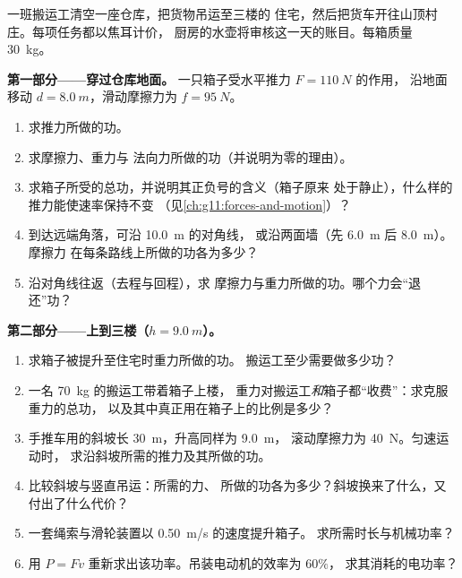 \begin{problem}
\label{pb:g11:work-of-force:1}
一班搬运工清空一座仓库，把货物吊运至三楼的
住宅，然后把货车开往山顶村庄。每项任务都以焦耳计价，
厨房的水壶将审核这一天的账目。每箱质量 \qty{30}{kg}。

\medskip
\noindent\textbf{第一部分——穿过仓库地面。}
一只箱子受水平推力 $F = \qty{110}{N}$ 的作用，
沿地面移动 $d = \qty{8.0}{m}$，滑动摩擦力为 $f = \qty{95}{N}$。
\begin{enumerate}
  \item 求推力所做的功。
  \item 求摩擦力、重力与
        法向力所做的功（并说明为零的理由）。
  \item 求箱子所受的总功，并说明其正负号的含义（箱子原来
        处于静止），什么样的推力能使速率保持不变
        （见\cref{ch:g11:forces-and-motion}）？
  \item 到达远端角落，可沿 \qty{10.0}{m} 的对角线，
        或沿两面墙（先 \qty{6.0}{m} 后 \qty{8.0}{m}）。摩擦力
        在每条路线上所做的功各为多少？
  \item 沿对角线往返（去程与回程），求
        摩擦力与重力所做的功。哪个力会“退还”功？
\end{enumerate}

\medskip
\noindent\textbf{第二部分——上到三楼（$h = \qty{9.0}{m}$）。}
\begin{enumerate}[resume]
  \item 求箱子被提升至住宅时重力所做的功。
        搬运工至少需要做多少功？
  \item 一名 \qty{70}{kg} 的搬运工带着箱子上楼，
        重力对搬运工\emph{和}箱子都“收费”：求克服重力的总功，
        以及其中真正用在箱子上的比例是多少？
  \item 手推车用的斜坡长 \qty{30}{m}，升高同样为 \qty{9.0}{m}，
        滚动摩擦力为 \qty{40}{N}。匀速运动时，
        求沿斜坡所需的推力及其所做的功。
  \item 比较斜坡与竖直吊运：所需的力、
        所做的功各为多少？斜坡换来了什么，又付出了什么代价？
  \item 一套绳索与滑轮装置以 \qty{0.50}{m/s} 的速度提升箱子。
        求所需时长与机械功率？
  \item 用 $P = Fv$ 重新求出该功率。吊装电动机的效率为 $60\%$，
        求其消耗的电功率？
\end{enumerate}


\end{problem}

